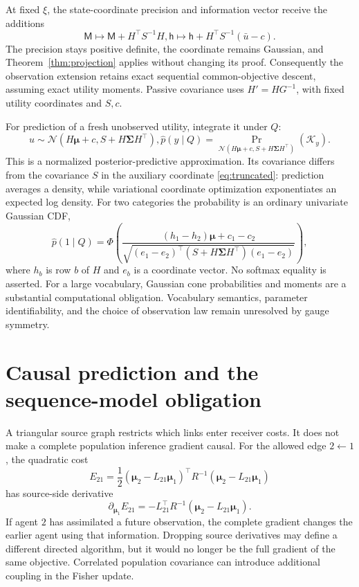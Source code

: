 \documentclass[11pt]{article}
\newcommand{\m}{\boldsymbol{\mu}}
\newcommand{\Sig}{\boldsymbol{\Sigma}}
\begin{document}
At fixed $\xi$, the state-coordinate precision and information vector receive the additions
\begin{equation}
\mathsf M\longmapsto\mathsf M+H^\top S^{-1}H,
\mathsf h\longmapsto\mathsf h+H^\top S^{-1}(\bar u-c).
\label{eq:utilitystate}
\end{equation}
The precision stays positive definite, the coordinate remains Gaussian, and Theorem~\ref{thm:projection} applies without changing its proof. Consequently the observation extension retains exact sequential common-objective descent, assuming exact utility moments. Passive covariance uses $H'=HG^{-1}$, with fixed utility coordinates and $S,c$.

For prediction of a fresh unobserved utility, integrate it under $Q$:
\begin{equation}
u\sim\mathcal N(H\m+c,S+H\Sig H^\top),
\widehat p(y\mid Q)=\Pr_{\mathcal N(H\m+c,S+H\Sig H^\top)}(\mathcal K_y).
\label{eq:utilitypredictive}
\end{equation}
This is a normalized posterior-predictive approximation. Its covariance differs from the covariance $S$ in the auxiliary coordinate \eqref{eq:truncated}: prediction averages a density, while variational coordinate optimization exponentiates an expected log density. For two categories the probability is an ordinary univariate Gaussian CDF,
\begin{equation}
\widehat p(1\mid Q)=\Phi\left(
\frac{(h_1-h_2)\m+c_1-c_2}
{\sqrt{(e_1-e_2)^\top(S+H\Sig H^\top)(e_1-e_2)}}\right),
\label{eq:binaryprobit}
\end{equation}
where $h_b$ is row $b$ of $H$ and $e_b$ is a coordinate vector. No softmax equality is asserted. For a large vocabulary, Gaussian cone probabilities and moments are a substantial computational obligation. Vocabulary semantics, parameter identifiability, and the choice of observation law remain unresolved by gauge symmetry.
\section{Causal prediction and the sequence-model obligation}
\label{sec:causality}

A triangular source graph restricts which links enter receiver costs. It does not make a complete population inference gradient causal. For the allowed edge $2\leftarrow1$, the quadratic cost
\begin{equation}
E_{21}=\frac12(\m_2-L_{21}\m_1)^\top R^{-1}(\m_2-L_{21}\m_1)
\label{eq:causalcost}
\end{equation}
has source-side derivative
\begin{equation}
\partial_{\m_1}E_{21}=-L_{21}^\top R^{-1}(\m_2-L_{21}\m_1).
\label{eq:sourcegradient}
\end{equation}
If agent $2$ has assimilated a future observation, the complete gradient changes the earlier agent using that information. Dropping source derivatives may define a different directed algorithm, but it would no longer be the full gradient of the same objective. Correlated population covariance can introduce additional coupling in the Fisher update.
\end{document}
